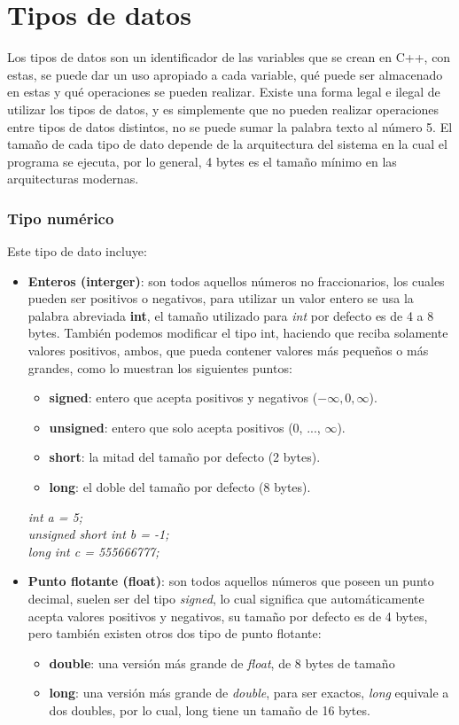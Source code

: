 \section{Tipos de datos}
Los tipos de datos son un identificador de las variables que se crean en C++, con estas, se puede dar un uso apropiado a cada variable, qué puede ser almacenado en estas y qué operaciones se pueden realizar. Existe una forma legal e ilegal de utilizar los tipos de datos, y es simplemente que no pueden realizar operaciones entre tipos de datos distintos, no se puede sumar la palabra texto al número 5. El tamaño de cada tipo de dato depende de la arquitectura del sistema en la cual el programa se ejecuta, por lo general, 4 bytes es el tamaño mínimo en las arquitecturas modernas.

\subsubsection{Tipo numérico}
Este tipo de dato incluye:
\begin{itemize}
    \item \textbf{Enteros (interger)}: son todos aquellos números no fraccionarios, los cuales pueden ser positivos o negativos, para utilizar un valor entero se usa la palabra abreviada \textbf{int}, el tamaño utilizado para \textit{int} por defecto es de 4 a 8 bytes. También podemos modificar el tipo int, haciendo que reciba solamente valores positivos, ambos, que pueda contener valores más pequeños o más grandes, como lo muestran los siguientes puntos:
    \begin{itemize}
        \item \textbf{signed}: entero que acepta positivos y negativos ($-\infty, 0, \infty$).
        \item \textbf{unsigned}: entero que solo acepta positivos (0, ..., $\infty$).
        \item \textbf{short}: la mitad del tamaño por defecto (2 bytes).
        \item \textbf{long}: el doble del tamaño por defecto (8 bytes).
    \end{itemize}
    \begin{center}
        \textit{int a = 5;}\\
        \textit{unsigned short int b = -1;}\\
        \textit{long int c = 555666777;}
    \end{center}
    \item \textbf{Punto flotante (float)}: son todos aquellos números que poseen un punto decimal, suelen ser del tipo \textit{signed}, lo cual significa que automáticamente acepta valores positivos y negativos, su tamaño por defecto es de 4 bytes, pero también existen otros dos tipo de punto flotante:
    \begin{itemize}
        \item \textbf{double}: una versión más grande de \textit{float}, de 8 bytes de tamaño
        \item \textbf{long}: una versión más grande de \textit{double}, para ser exactos, \textit{long} equivale a dos doubles, por lo cual, long tiene un tamaño de 16 bytes.
    \end{itemize}
\end{itemize}
